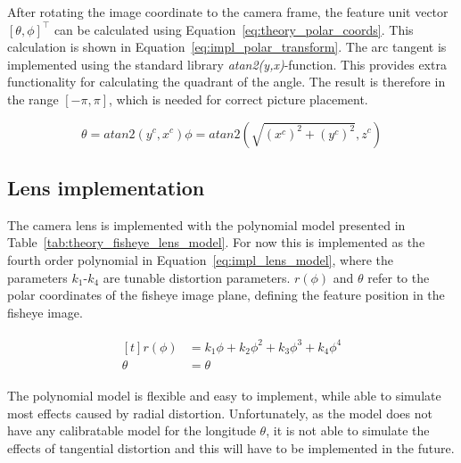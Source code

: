 After rotating the image coordinate to the camera frame, the feature unit vector $[\theta, \phi]^\top$ can be calculated using Equation~\eqref{eq:theory_polar_coords}. This calculation is shown in Equation~\eqref{eq:impl_polar_transform}. The arc tangent is implemented using the standard library \emph{atan2(y,x)}-function. This provides extra functionality for calculating the quadrant of the angle. The result is therefore in the range $[-\pi,\pi]$, which is needed for correct picture placement.

\begin{subequations}
    \begin{equation}
        \theta = atan2\left(y^c,x^c\right)
        \label{eq:impl_polar_transform_theta}
    \end{equation}
    \begin{equation}
        \phi = atan2\left(\sqrt{(x^c)^2 + (y^c)^2},z^c\right)
        \label{eq:impl_polar_transform_phi}
    \end{equation}
    \label{eq:impl_polar_transform}
\end{subequations}

\subsection{Lens implementation} \label{sec:lens_modeling}

The camera lens is implemented with the polynomial model presented in Table~\ref{tab:theory_fisheye_lens_model}. For now this is implemented as the fourth order polynomial in Equation~\eqref{eq:impl_lens_model}, where the parameters $k_1$-$k_4$ are tunable distortion parameters. $r(\phi)$ and $\theta$ refer to the polar coordinates of the fisheye image plane, defining the feature position in the fisheye image.

\begin{align}
    \begin{aligned}[t]
    r(\phi) &= k_1 \phi + k_2 \phi^2 + k_3 \phi^3 + k_4 \phi^4 \\[0.75ex]
    \theta &= \theta
    \end{aligned}
    \label{eq:impl_lens_model}
\end{align}

The polynomial model is flexible and easy to implement, while able to simulate most effects caused by radial distortion. Unfortunately, as the model does not have any calibratable model for the longitude $\theta$, it is not able to simulate the effects of tangential distortion and this will have to be implemented in the future.

